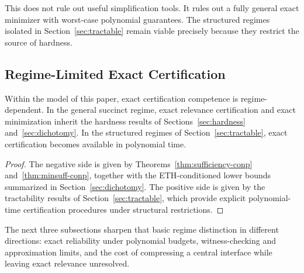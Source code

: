 \begin{remark}
This does not rule out useful simplification tools. It rules out a fully general exact minimizer with worst-case polynomial guarantees. The structured regimes isolated in Section~\ref{sec:tractable} remain viable precisely because they restrict the source of hardness.
\end{remark}

\subsection{Regime-Limited Exact Certification}

\begin{proposition}
\label{prop:competence-by-regime}
Within the model of this paper, exact certification competence is regime-dependent. In the general succinct regime, exact relevance certification and exact minimization inherit the hardness results of Sections~\ref{sec:hardness} and~\ref{sec:dichotomy}. In the structured regimes of Section~\ref{sec:tractable}, exact certification becomes available in polynomial time.
\end{proposition}


\begin{proof}
The negative side is given by Theorems~\ref{thm:sufficiency-conp} and~\ref{thm:minsuff-conp}, together with the ETH-conditioned lower bounds summarized in Section~\ref{sec:dichotomy}. The positive side is given by the tractability results of Section~\ref{sec:tractable}, which provide explicit polynomial-time certification procedures under structural restrictions.
\end{proof}

The next three subsections sharpen that basic regime distinction in different directions: exact reliability under polynomial budgets, witness-checking and approximation limits, and the cost of compressing a central interface while leaving exact relevance unresolved.
